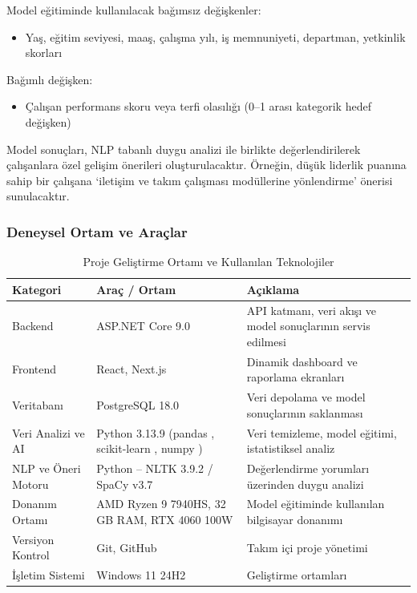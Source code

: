 \documentclass[a4paper,12pt]{article}
\begin{document}
\noindent Model eğitiminde kullanılacak bağımsız değişkenler:
\begin{itemize}
    \item Yaş, eğitim seviyesi, maaş, çalışma yılı, iş memnuniyeti, departman, yetkinlik skorları
\end{itemize}

\noindent Bağımlı değişken:
\begin{itemize}
    \item Çalışan performans skoru veya terfi olasılığı (0–1 arası kategorik hedef değişken)

\end{itemize}

\noindent Model sonuçları, NLP tabanlı duygu analizi ile birlikte değerlendirilerek çalışanlara özel gelişim önerileri oluşturulacaktır. Örneğin, düşük liderlik puanına sahip bir çalışana ‘iletişim ve takım çalışması modüllerine yönlendirme’ önerisi sunulacaktır.
\subsubsection*{Deneysel Ortam ve Araçlar}

\begin{table}[h!]
\centering
\renewcommand{\arraystretch}{1.3} %
\begin{tabular}{|p{3cm}|p{5cm}|p{7cm}|}
\hline
\textbf{Kategori} & \textbf{Araç / Ortam} & \textbf{Açıklama} \\ \hline
Backend & ASP.NET Core 9.0 & API katmanı, veri akışı ve model sonuçlarının servis edilmesi \\ \hline
Frontend & React, Next.js & Dinamik dashboard ve raporlama ekranları \\ \hline
Veritabanı & PostgreSQL 18.0 & Veri depolama ve model sonuçlarının saklanması \\ \hline
Veri Analizi ve AI & Python 3.13.9 (pandas \cite{mckinney2010pandas}, scikit-learn \cite{pedregosa2011sklearn}, numpy \cite{harris2020numpy}) & Veri temizleme, model eğitimi, istatistiksel analiz \\ \hline
NLP ve Öneri Motoru & Python – NLTK 3.9.2 \cite{bird2009nltk} / SpaCy v3.7 \cite{honnibal2020spacy} & Değerlendirme yorumları üzerinden duygu analizi \\ \hline
Donanım Ortamı & AMD Ryzen 9 7940HS, 32 GB RAM, RTX 4060 100W  & Model eğitiminde kullanılan bilgisayar donanımı \\ \hline
Versiyon Kontrol & Git, GitHub & Takım içi proje yönetimi \\ \hline
İşletim Sistemi & Windows 11 24H2  & Geliştirme ortamları \\ \hline
\end{tabular}
\caption{Proje Geliştirme Ortamı ve Kullanılan Teknolojiler}
\label{tab:teknolojiler}
\end{table}
\end{document}
